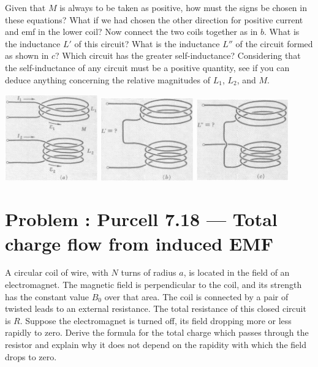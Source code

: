 \documentclass[problems]{esg8022pset}
\begin{document}
  Given that $M$ is always to be taken as positive, how must the signs be
  chosen in these equations? What if we had chosen the other direction for
  positive current and emf in the lower coil? Now connect the two coils
  together as in $b$. What is the inductance $L'$ of this circuit? What is the
  inductance $L''$ of the circuit formed as shown in $c$? Which circuit has the
  greater self-inductance? Considering that the self-inductance of any circuit
  must be a positive quantity, see if you can deduce anything concerning the
  relative magnitudes of $L_1$, $L_2$, and $M$.

  \begin{center}
    \includegraphics[width = 0.3\textwidth]{pu711a}
    \includegraphics[width = 0.3\textwidth]{pu711b}
    \includegraphics[width = 0.3\textwidth]{pu711c}
  \end{center}
\section{Problem \thesection: Purcell 7.18 --- Total charge flow from induced EMF}
  A circular coil of wire, with $N$ turns of radius $a$, is located in the
  field of an electromagnet.  The magnetic field is perpendicular to the coil,
  and its strength has the constant value $B_{0}$ over that area.  The coil is
  connected by a pair of twisted leads to an external resistance. The total
  resistance of this closed circuit is $R$. Suppose the electromagnet is turned
  off, its field dropping more or less rapidly to zero. Derive the formula for
  the total charge which passes through the resistor and explain why it does
  not depend on the rapidity with which the field drops to zero.
\end{document}
